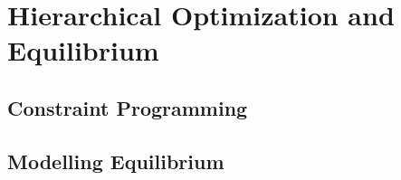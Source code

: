 \section{Hierarchical Optimization and Equilibrium}
\subsection{Constraint Programming}
\subsection{Modelling Equilibrium}
